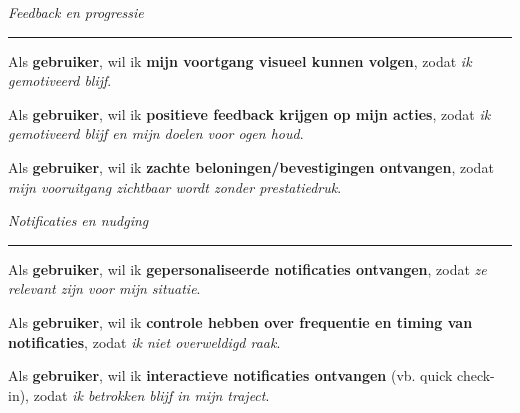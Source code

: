 \vspace{1em}
\vspace{1em}

\textit{Feedback en progressie}
\hrule
\vspace{1em}

Als \textbf{gebruiker}, \newline
wil ik \textbf{mijn voortgang visueel kunnen volgen}, \newline
zodat \textit{ik gemotiveerd blijf}.

\vspace{1em}

Als \textbf{gebruiker}, \newline
wil ik \textbf{positieve feedback krijgen op mijn acties}, \newline
zodat \textit{ik gemotiveerd blijf en mijn doelen voor ogen houd}.

\vspace{1em}

Als \textbf{gebruiker}, \newline
wil ik \textbf{zachte beloningen/bevestigingen ontvangen}, \newline
zodat \textit{mijn vooruitgang zichtbaar wordt zonder prestatiedruk}.

\vspace{1em}
\vspace{1em}

\textit{Notificaties en nudging}
\hrule
\vspace{1em}

Als \textbf{gebruiker}, \newline
wil ik \textbf{gepersonaliseerde notificaties ontvangen}, \newline
zodat \textit{ze relevant zijn voor mijn situatie}.

\vspace{1em}

Als \textbf{gebruiker}, \newline
wil ik \textbf{controle hebben over frequentie en timing van notificaties}, \newline
zodat \textit{ik niet overweldigd raak}.

\vspace{1em}

Als \textbf{gebruiker}, \newline
wil ik \textbf{interactieve notificaties ontvangen} (vb. quick check-in), \newline
zodat \textit{ik betrokken blijf in mijn traject}.

